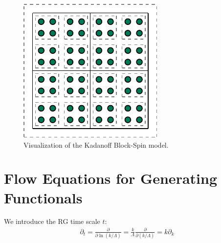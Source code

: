 \begin{figure}[H]
\centering
\includegraphics{figs/TikZ/block_spin_model}
\caption[Visualization of the Kadanoff Block-Spin model.]{Visualization of the Kadanoff Block-Spin model.\footnotemark}
\label{fig:kadanoff}
\end{figure}
\blindtext




 
 
\section{Flow Equations for Generating Functionals}
We introduce the RG time scale $t$:
\begin{align}
	\partial_t = \frac{\partial}{\partial\ln(k/\Lambda)} = \frac{k}{\Lambda}\frac{\partial}{\partial(k/\Lambda)} = k \partial_k
\end{align}


